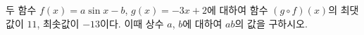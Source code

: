 두 함수 $f(x)=a\sin x-b$, $g(x)=-3x+2$에 대하여 함수 $(g\circ f)(x)$의 최댓값이 $11$, 최솟값이 $-13$이다. 이때 상수 $a$, $b$에 대하여 $ab$의 값을 구하시오. 
